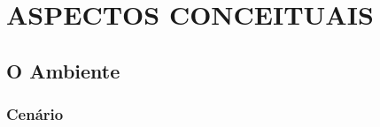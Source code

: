 \chapter{ASPECTOS CONCEITUAIS}

\section{O Ambiente} %
\label{sec:o_ambiente}

\subsection{Cenário}

